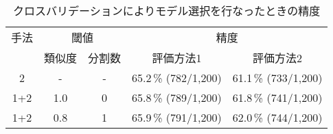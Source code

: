 \begin{table}[htbp]
  \begin{center}
    \caption{クロスバリデーションによりモデル選択を行なったときの精度}
    \label{tab:exp:cross_valid}
    \begin{tabular}[c]{|c|c|c|r|r|}
      \hline
      手法 & \multicolumn{2}{c|}{閾値} & \multicolumn{2}{c|}{精度}\\
      \cline{2-5}
      & 類似度 & 分割数 
      & \multicolumn{1}{c|}{評価方法1} & \multicolumn{1}{c|}{評価方法2} \\
      \hline
      2 & - & - & 65.2\,\% (782/1,200) & 61.1\,\% (733/1,200)\\
      1+2 & 1.0 & 0 & 65.8\,\% (789/1,200) & 61.8\,\% (741/1,200)\\
      1+2 & 0.8 & 1 & 65.9\,\% (791/1,200) & 62.0\,\% (744/1,200)\\
      \hline
    \end{tabular}
  \end{center}
\end{table}

